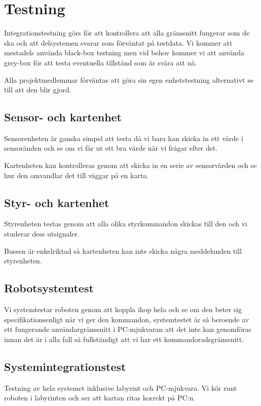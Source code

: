 \section{Testning}
Integrationstestning görs för att kontrollera att alla gränssnitt fungerar som
de ska och att delsystemen svarar som förväntat på testdata. Vi kommer att
mestadels använda black-box testning men vid behov kommer vi att använda 
grey-box för att testa eventuella tillstånd som är svåra att nå.

Alla projektmedlemmar förväntas att göra sin egen enhetstestning alternativt se 
till att den blir gjord.

\subsection{Sensor- och kartenhet}
Sensorenheten är ganska simpel att testa då vi bara kan skicka in ett värde i
sensoränden och se om vi får ut ett bra värde när vi frågar efter det.

Kartenheten kan kontrolleras genom att skicka in en serie av sensorvärden och
se hur den omvandlar det till väggar på en karta.

\subsection{Styr- och kartenhet}
Styrenheten testas genom att alla olika styrkommandon skickas till den och vi
studerar dess utsignaler.

Bussen är enkelriktad så kartenheten kan inte skicka några meddelanden till
styrenheten.

\subsection{Robotsystemtest}
Vi systemtestar roboten genom att koppla ihop hela och se om den beter sig
specifikationsenligt när vi ger den kommandon, systemtestet är så beroende av
ett fungerande användargränssnitt i PC-mjukvaran att det inte kan genomföras
innan det är i alla fall så fullständigt att vi har ett kommandoradsgränssnitt.

\subsection{Systemintegrationstest}
Testning av hela systemet inklusive labyrint och PC-mjukvara. Vi kör runt
roboten i labyrinten och ser att kartan ritas korrekt på PC:n.
